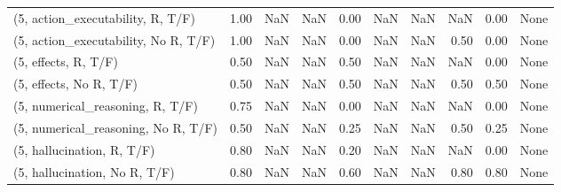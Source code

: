 \begin{table*}[h!]
\begin{adjustbox}{width=2\columnwidth,center}
\begin{tabular}{lrrr|rrr|rrr}
(5, action\_executability, R, T/F)    &                      1.00 &                   NaN &                       NaN &                          0.00 &                       NaN &                           NaN &                                    NaN &                               0.00 &                                  None \\
(5, action\_executability, No R, T/F) &                      1.00 &                   NaN &                       NaN &                          0.00 &                       NaN &                           NaN &                                   0.50 &                               0.00 &                                  None \\
(5, effects, R, T/F)                 &                      0.50 &                   NaN &                       NaN &                          0.50 &                       NaN &                           NaN &                                    NaN &                               0.00 &                                  None \\
(5, effects, No R, T/F)              &                      0.50 &                   NaN &                       NaN &                          0.50 &                       NaN &                           NaN &                                   0.50 &                               0.50 &                                  None \\
(5, numerical\_reasoning, R, T/F)     &                      0.75 &                   NaN &                       NaN &                          0.00 &                       NaN &                           NaN &                                    NaN &                               0.00 &                                  None \\
(5, numerical\_reasoning, No R, T/F)  &                      0.50 &                   NaN &                       NaN &                          0.25 &                       NaN &                           NaN &                                   0.50 &                               0.25 &                                  None \\
(5, hallucination, R, T/F)           &                      0.80 &                   NaN &                       NaN &                          0.20 &                       NaN &                           NaN &                                    NaN &                               0.00 &                                  None \\
(5, hallucination, No R, T/F)        &                      0.80 &                   NaN &                       NaN &                          0.60 &                       NaN &                           NaN &                                   0.80 &                               0.80 &                                  None \\

\end{tabular}
\end{adjustbox}
\end{table*}
